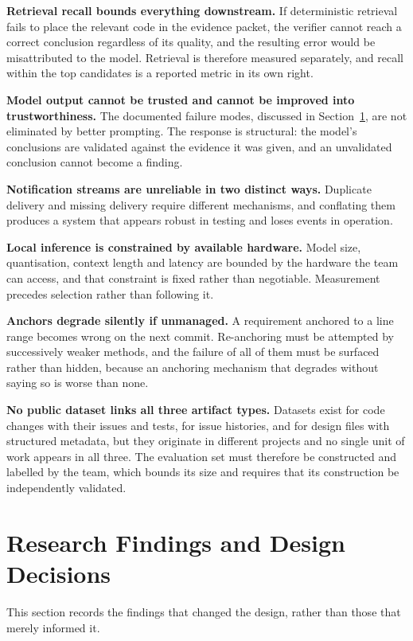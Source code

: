 \textbf{Retrieval recall bounds everything downstream.} If deterministic
retrieval fails to place the relevant code in the evidence packet, the verifier
cannot reach a correct conclusion regardless of its quality, and the resulting
error would be misattributed to the model. Retrieval is therefore measured
separately, and recall within the top candidates is a reported metric in its own
right.

\textbf{Model output cannot be trusted and cannot be improved into
trustworthiness.} The documented failure modes, discussed in
Section~\ref{sec:ch2-findings}, are not eliminated by better prompting. The
response is structural: the model's conclusions are validated against the
evidence it was given, and an unvalidated conclusion cannot become a finding.

\textbf{Notification streams are unreliable in two distinct ways.} Duplicate
delivery and missing delivery require different mechanisms, and conflating them
produces a system that appears robust in testing and loses events in operation.

\textbf{Local inference is constrained by available hardware.} Model size,
quantisation, context length and latency are bounded by the hardware the team
can access, and that constraint is fixed rather than negotiable. Measurement
precedes selection rather than following it.

\textbf{Anchors degrade silently if unmanaged.} A requirement anchored to a line
range becomes wrong on the next commit. Re-anchoring must be attempted by
successively weaker methods, and the failure of all of them must be surfaced
rather than hidden, because an anchoring mechanism that degrades without saying
so is worse than none.

\textbf{No public dataset links all three artifact types.} Datasets exist for
code changes with their issues and tests, for issue histories, and for design
files with structured metadata, but they originate in different projects and no
single unit of work appears in all three. The evaluation set must therefore be
constructed and labelled by the team, which bounds its size and requires that
its construction be independently validated.

\section{Research Findings and Design Decisions}
\label{sec:ch2-findings}

This section records the findings that changed the design, rather than those
that merely informed it.

